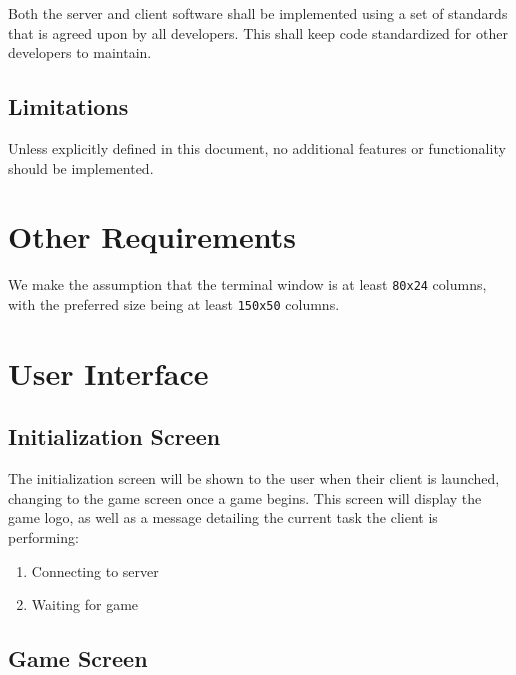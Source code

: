 \documentclass[letterpaper]{article}
\begin{document}
Both the server and client software shall be implemented using
a set of standards that is agreed upon by all developers. This
shall keep code standardized for other developers to maintain.

\subsection{Limitations}
\label{sec:nofun_reqs_limitations}

Unless explicitly defined in this document, no additional
features or functionality should be implemented.


\section{Other Requirements}
\label{sec:other}

We make the assumption that the terminal window is at least
\texttt{80x24} columns, with the preferred size being at least
\texttt{150x50} columns.


\section{User Interface}
\label{sec:ui}

\subsection{Initialization Screen}
\label{sec:ui_initial}

The initialization screen will be shown to the user when their
client is launched, changing to the game screen once a game
begins. This screen will display the game logo, as well as a
message detailing the current task the client is performing:

\begin{enumerate}
    \item Connecting to server
    \item Waiting for game
\end{enumerate}

\subsection{Game Screen}
\label{sec:ui_game}
\end{document}
